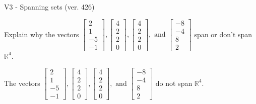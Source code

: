 \begin{exercise}
  \begin{exerciseTitle}V3 - Spanning sets (ver. 426)\end{exerciseTitle}
  \begin{exerciseStatement}
    Explain why the vectors \(\left[\begin{array}{r}
2 \\
1 \\
-5 \\
-1
\end{array}\right] , \left[\begin{array}{r}
4 \\
2 \\
2 \\
0
\end{array}\right] , \left[\begin{array}{r}
4 \\
2 \\
2 \\
0
\end{array}\right] , \text{ and } \left[\begin{array}{r}
-8 \\
-4 \\
8 \\
2
\end{array}\right]\) span or don't span \(\mathbb{R}^4\). 
	


  \end{exerciseStatement}
  \begin{exerciseAnswer}
   The vectors \(\left[\begin{array}{r}
2 \\
1 \\
-5 \\
-1
\end{array}\right] , \left[\begin{array}{r}
4 \\
2 \\
2 \\
0
\end{array}\right] , \left[\begin{array}{r}
4 \\
2 \\
2 \\
0
\end{array}\right] , \text{ and } \left[\begin{array}{r}
-8 \\
-4 \\
8 \\
2
\end{array}\right]\) 
  	 do not  
	span \(\mathbb{R}^4\).
  


  \end{exerciseAnswer}
\end{exercise}